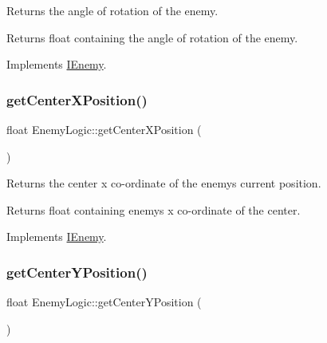 Returns the angle of rotation of the enemy. 

\begin{DoxyReturn}{Returns}
float containing the angle of rotation of the enemy. 
\end{DoxyReturn}


Implements \hyperlink{class_i_enemy}{I\+Enemy}.

\mbox{\label{class_enemy_logic_a1429e91a81da7646d9b0280f26519d8c}} 
\subsubsection{\texorpdfstring{get\+Center\+X\+Position()}{getCenterXPosition()}}
{\footnotesize\ttfamily float Enemy\+Logic\+::get\+Center\+X\+Position (\begin{DoxyParamCaption}{ }\end{DoxyParamCaption})\hspace{0.3cm}{\ttfamily [virtual]}}



Returns the center x co-\/ordinate of the enemy\textquotesingle{}s current position. 

\begin{DoxyReturn}{Returns}
float containing enemy\textquotesingle{}s x co-\/ordinate of the center. 
\end{DoxyReturn}


Implements \hyperlink{class_i_enemy}{I\+Enemy}.

\mbox{\label{class_enemy_logic_a8eb47a87a47288783e0c8963c39d24e4}} 
\subsubsection{\texorpdfstring{get\+Center\+Y\+Position()}{getCenterYPosition()}}
{\footnotesize\ttfamily float Enemy\+Logic\+::get\+Center\+Y\+Position (\begin{DoxyParamCaption}{ }\end{DoxyParamCaption})\hspace{0.3cm}{\ttfamily [virtual]}}



